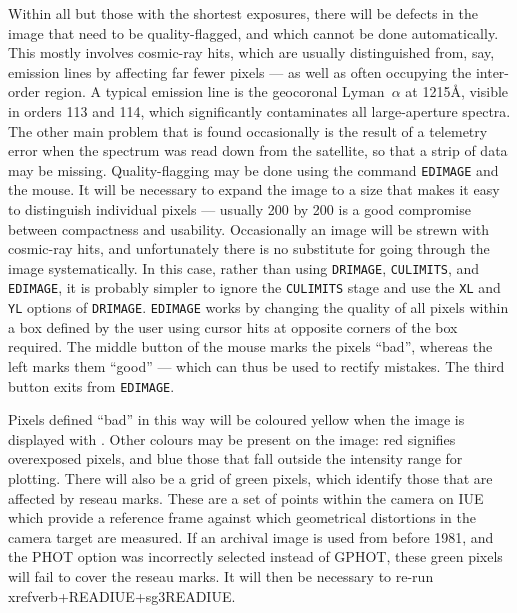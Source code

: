 \begin{htmlonly}
Within all but those with the shortest exposures, there will be defects in the
image that need to be quality-flagged, and which cannot be done automatically.
This mostly involves cosmic-ray hits, which are usually distinguished from,
say, emission lines by affecting far fewer pixels --- as well as often
occupying the inter-order region.  A typical emission line is the geocoronal
Lyman~$\alpha$ at 1215{\AA}, visible in orders 113 and 114, which significantly
contaminates all large-aperture spectra. The other main problem that is found
occasionally is the result of a telemetry error when the spectrum was read down
from the satellite, so that a strip of data may be missing.  Quality-flagging
may be done using the command
\verb+EDIMAGE+ and the mouse.  It will be necessary to expand the image to a
size that makes it easy to distinguish individual pixels --- usually 200 by 200
is a good compromise between compactness and usability. Occasionally an image
will be strewn with cosmic-ray hits, and unfortunately there is no substitute
for going through the image systematically.  In this case, rather than using
\verb+DRIMAGE+,
\verb+CULIMITS+, and \verb+EDIMAGE+, it is probably simpler to ignore the
\verb+CULIMITS+ stage and use the
\verb+XL+ and \verb+YL+ options of \verb+DRIMAGE+\@. \verb+EDIMAGE+ works by
changing the quality of all pixels within a box defined by the user using
cursor hits at opposite corners of the box required.  The middle button of the
mouse marks the pixels ``bad'', whereas the left marks them ``good'' --- which
can thus be used to rectify mistakes.  The third button exits from
\verb+EDIMAGE+\@.
\end{htmlonly}

Pixels defined ``bad'' in this way will be coloured yellow when the image is
displayed with \@. Other colours may be
present on the image:
red signifies overexposed pixels, and blue those that fall outside the
intensity range for plotting. There will also be a grid of green pixels, which
identify those that are affected by reseau marks.  These are a set of points
within the camera on IUE which provide a reference frame against which
geometrical distortions in the camera target are measured.  If an archival
image is used from before 1981, and the PHOT option was incorrectly
selected instead of GPHOT, these green pixels will fail to cover the
reseau marks.  It will then be necessary to re-run
\\xref{verb+READIUE+}{sg3}{READIUE}\@.

